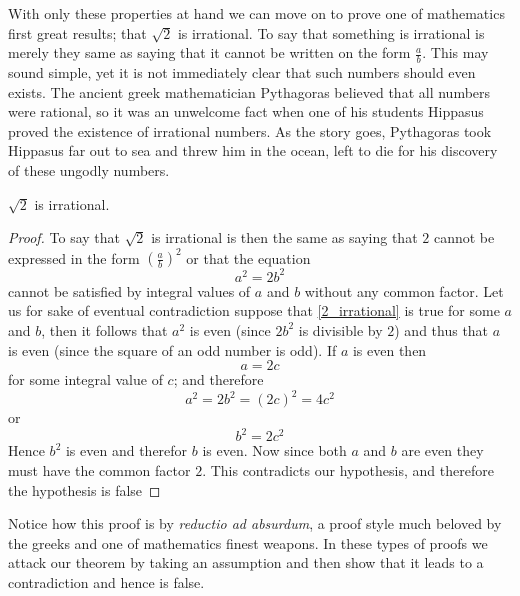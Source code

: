 \myindent With only these properties at hand we can move on to prove one of mathematics first great results; that
$\sqrt{2}$ is irrational. To say that something is irrational is merely they same as saying that it cannot be written on
the form $\frac{a}{b}$. This may sound simple, yet it is not immediately clear that such numbers should even exists. The
ancient greek mathematician Pythagoras believed that all numbers were rational, so it was an unwelcome fact when one of
his students Hippasus proved the existence of irrational numbers. As the story goes, Pythagoras took Hippasus far out to
sea and threw him in the ocean, left to die for his discovery of these ungodly numbers.  
\begin{prop}
$\sqrt{2}$ is irrational.
\end{prop}
\begin{proof}
To say that $\sqrt{2}$ is irrational is then the same as saying that $2$ cannot be expressed in the form
$\left(\frac{a}{b}\right)^2$ or that the equation 
\begin{equation}\label{2_irrational}
a^2 = 2b^2
\end{equation}
cannot be satisfied by integral values of $a$ and $b$ without any common factor. Let us for sake of eventual
contradiction suppose that \ref{2_irrational} is true for some $a$ and $b$, then it follows that $a^2$ is even (since
$2b^2$ is divisible by $2$) and thus that $a$ is even (since the square of an odd number is odd). If $a$ is even then
\[
a = 2c
\]
for some integral value of $c$; and therefore
\[
 a^2 = 2b^2 = (2c)^2 = 4c^2
\]
or
\[
b^2 = 2c^2
\]
Hence $b^2$ is even and therefor $b$ is even. Now since both $a$ and $b$ are even they must have the common factor $2$.
This contradicts our hypothesis, and therefore the hypothesis is false 
\end{proof}
Notice how this proof is by  \emph{reductio ad absurdum}, a proof style much beloved by the greeks and one of
mathematics finest weapons. In these types of proofs we attack our theorem by taking an assumption and then show that it
leads to a contradiction and hence is false. 

